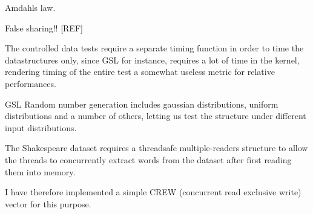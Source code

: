 Amdahls law.

False sharing!! [REF]

The controlled data tests require a separate timing function in order to time
the datastructures only, since GSL for instance, requires a lot of time in the
kernel, rendering timing of the entire test a somewhat useless metric for
relative performances.

GSL Random number generation includes gaussian distributions, uniform
distributions and a number of others, letting us test the structure under
different input distributions.

The Shakespeare dataset requires a threadsafe multiple-readers structure to
allow the threads to concurrently extract words from the dataset after first
reading them into memory.

I have therefore implemented a simple CREW (concurrent read exclusive write)
vector for this purpose. 

